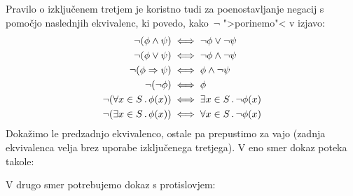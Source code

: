 Pravilo o izključenem tretjem je koristno tudi za poenostavljanje negacij
s pomočjo naslednjih ekvivalenc, ki povedo, kako~$\lnot$ ">porinemo"< v izjavo:
%
\begin{align*}
  \lnot (\phi \land \psi) &\iff \lnot\phi \lor \lnot\psi \\
  \lnot (\phi \lor \psi) &\iff \lnot\phi \land \lnot\psi \\
  \lnot (\phi \Rightarrow \psi) &\iff \phi \land \lnot\psi \\
  \lnot (\lnot \phi) &\iff \phi \\
  \lnot (\forall x \in S \,.\, \phi(x)) &\iff \exists x \in S \,.\, \lnot\phi(x) \\
  \lnot (\exists x \in S \,.\, \phi(x)) &\iff \forall x \in S \,.\, \lnot\phi(x)
\end{align*}
%
Dokažimo le predzadnjo ekvivalenco, ostale pa prepustimo za vajo (zadnja ekvivalenca velja brez uporabe izključenega tretjega).
%
V eno smer dokaz poteka takole:
%
\begin{boxDisplay}
  \begin{boxedProof}[numbered]
    \begin{boxFrame}
    \end{boxFrame}
  \end{boxedProof}
\end{boxDisplay}
%
V drugo smer potrebujemo dokaz s protislovjem:
%
